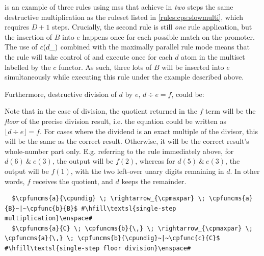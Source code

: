  is an example of three rules using \glspl{ms} that achieve in \emph{two} steps the same destructive multiplication as the ruleset listed in \cref{rules:cps:slowmulti}, which requires \(D + 1\) steps.  Crucially, the second rule is still \emph{one} rule application, but the insertion of \(B\) into \(e\) happens once for each possible match on the promoter.  The use of \(c(d\_)\) combined with the maximally parallel rule mode means that the rule will take control of and execute once for each \(d\) atom in the multiset labelled by the \(c\) functor.  As such, three lots of \(B\) will be inserted into \(e\) simultaneously while executing this rule under the example described above.



Furthermore, destructive division of \(d\) by \(e\), \(d \div e = f\), could be:

Note that in the case of division, the quotient returned in the \(f\) term will be the \emph{floor} of the precise division result, i.e. the equation could be written as \(\lfloor d \div e \rfloor = f\).  For cases where the dividend is an exact multiple of the divisor, this will be the same as the correct result.  Otherwise, it will be the correct result's whole-number part only.  E.g. referring to the rule immediately above, for \(d(6)~\&~e(3)\), the output will be \(f(2)\), whereas for \(d(5)~\&~e(3)\), the output will be \(f(1)\), with the two left-over unary digits remaining in \(d\).  In other words, \(f\) receives the quotient, and \(d\) keeps the remainder.

\lstset{xleftmargin=.5in, xrightmargin=.5in} 
\begin{lstlisting}
  $\cpfuncms{a}{\cpundig} \; \rightarrow_{\cpmaxpar} \; \cpfuncms{a}{B}~|~\cpfunc{b}{B}$ #\hfill\textsl{single-step multiplication}\enspace#
  $\cpfuncms{a}{C} \; \cpfuncms{b}{\,} \; \rightarrow_{\cpmaxpar} \; \cpfuncms{a}{\,} \; \cpfuncms{b}{\cpundig}~|~\cpfunc{c}{C}$ #\hfill\textsl{single-step floor division}\enspace#
\end{lstlisting}

